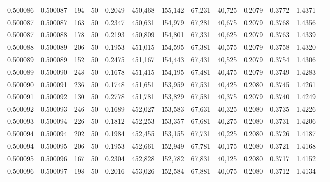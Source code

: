 \begin{tabular}{rrrrrrrrrrrrr}
0.500086 & 0.500087 & 194 &  50 &                                     0.2049 & 450,468 & 155,142 &  67,231 &  40,725 & 0.2079 & 0.3772 & 1.4371 \\
0.500087 & 0.500087 & 163 &  50 &                                     0.2347 & 450,631 & 154,979 &  67,281 &  40,675 & 0.2079 & 0.3768 & 1.4356 \\
0.500087 & 0.500088 & 178 &  50 &                                     0.2193 & 450,809 & 154,801 &  67,331 &  40,625 & 0.2079 & 0.3763 & 1.4339 \\
0.500088 & 0.500089 & 206 &  50 &                                     0.1953 & 451,015 & 154,595 &  67,381 &  40,575 & 0.2079 & 0.3758 & 1.4320 \\
0.500089 & 0.500089 & 152 &  50 &                                     0.2475 & 451,167 & 154,443 &  67,431 &  40,525 & 0.2079 & 0.3754 & 1.4306 \\
0.500089 & 0.500090 & 248 &  50 &                                     0.1678 & 451,415 & 154,195 &  67,481 &  40,475 & 0.2079 & 0.3749 & 1.4283 \\
0.500090 & 0.500091 & 236 &  50 &                                     0.1748 & 451,651 & 153,959 &  67,531 &  40,425 & 0.2080 & 0.3745 & 1.4261 \\
0.500091 & 0.500092 & 130 &  50 &                                     0.2778 & 451,781 & 153,829 &  67,581 &  40,375 & 0.2079 & 0.3740 & 1.4249 \\
0.500092 & 0.500093 & 246 &  50 &                                     0.1689 & 452,027 & 153,583 &  67,631 &  40,325 & 0.2080 & 0.3735 & 1.4226 \\
0.500093 & 0.500094 & 226 &  50 &                                     0.1812 & 452,253 & 153,357 &  67,681 &  40,275 & 0.2080 & 0.3731 & 1.4206 \\
0.500094 & 0.500094 & 202 &  50 &                                     0.1984 & 452,455 & 153,155 &  67,731 &  40,225 & 0.2080 & 0.3726 & 1.4187 \\
0.500094 & 0.500095 & 206 &  50 &                                     0.1953 & 452,661 & 152,949 &  67,781 &  40,175 & 0.2080 & 0.3721 & 1.4168 \\
0.500095 & 0.500096 & 167 &  50 &                                     0.2304 & 452,828 & 152,782 &  67,831 &  40,125 & 0.2080 & 0.3717 & 1.4152 \\
0.500096 & 0.500097 & 198 &  50 &                                     0.2016 & 453,026 & 152,584 &  67,881 &  40,075 & 0.2080 & 0.3712 & 1.4134 \\

\end{tabular}
